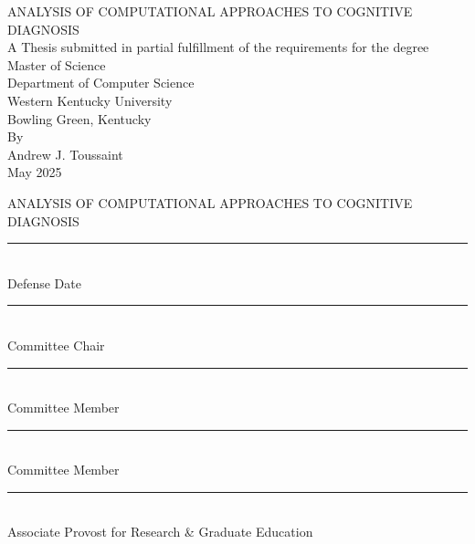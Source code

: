 \documentclass[letterpaper, 12pt, captions=tableabove]{scrreprt}
\begin{document}
\newcommand{\wkuTitle}{\uppercase{analysis of computational approaches to cognitive diagnosis}}

\begin{titlepage}
	\begin{center}
\vspace*{2in}
\wkuTitle \\
\vspace*{2in - \baselineskip}
A Thesis submitted in partial fulfillment of the requirements for the degree \\ Master of Science \\
\vspace*{2in - 2\baselineskip}
Department of Computer Science \\ Western Kentucky University \\ Bowling Green, Kentucky\\
\vspace*{2in - 3\baselineskip}
By \\  Andrew J. Toussaint \\ \vspace*{\baselineskip} May 2025
	\end{center}
\end{titlepage}

\thispagestyle{empty}
\begin{center}
	\wkuTitle \\
\end{center}
	\vspace*{4in - \baselineskip}
	\noindent\rule{2in}{0.4pt}\\
	\noindent Defense Date \vspace{2\baselineskip} \\
	\noindent\rule{3.5in}{0.4pt}\\	
	Committee Chair  \vspace{2\baselineskip} \\
	\noindent\rule{3.5in}{0.4pt}\\
	Committee Member \vspace{2\baselineskip} \\
	\noindent\rule{3.5in}{0.4pt}\\
	Committee Member \vspace*{4.5in - 14\baselineskip} \\
	\noindent\rule{3.5in}{0.4pt}\\
	Associate Provost for Research \& Graduate Education\\
\end{document}
